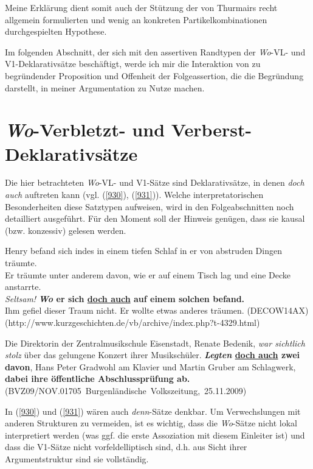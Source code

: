 {Meine Erklärung dient somit auch der Stützung der von Thurmairs recht allgemein formulierten und wenig an konkreten Partikelkombinationen durchgespielten Hypothese.

Im folgenden Abschnitt, der sich mit den assertiven Randtypen der \textit{Wo}-VL- und V1-Deklarativsätze beschäftigt, werde ich mir die Interaktion von zu begründender Proposition und Offenheit der Folgeassertion, die die Begründung darstellt, in meiner Argumentation zu Nutze machen.
\setcounter{equation}{0}
\section{\textit{Wo}-Verbletzt- und Verberst-Deklarativsätze}
\label{sec:Rand}
Die hier betrachteten \textit{Wo}-VL- und V1-Sätze sind Deklarativsätze, in denen \textit{doch auch} auftreten kann (vgl. (\ref{930}), (\ref{931})). Welche interpretatorischen Besonderheiten diese Satztypen aufweisen, wird in den Folgeabschnitten noch detailliert ausgeführt. Für den Moment soll der Hinweis genügen, dass sie kausal (bzw. konzessiv) gelesen werden.

\begin{exe}
	\ex\label{930}
	\scriptsize
	Henry befand sich indes in einem tiefen Schlaf in er von abstruden Dingen träumte.\\
	Er träumte unter anderem davon, wie er auf einem Tisch lag und eine Decke anstarrte.\\
	\emph{Seltsam!} \textbf{\textit{Wo} er sich \underline{doch auch} auf einem solchen befand.}\\
	Ihm gefiel dieser Traum nicht. Er wollte etwas anderes träumen. 				         
	\hfill\hbox{(DECOW14AX)}
	\newline
	\hbox{}\hfill\hbox{(http://www.kurzgeschichten.de/vb/archive/index.php?t-4329.html)}
\end{exe}

\begin{exe}
	\ex\label{931}
	\scriptsize
	Die Direktorin der Zentralmusikschule Eisenstadt, Renate Bedenik, \emph{war sichtlich stolz} über das gelungene Konzert ihrer Musikschüler. 				\textbf{\textit{Legten} \underline{doch auch} zwei davon}, Hans Peter Gradwohl am Klavier und Martin Gruber am Schlagwerk, \textbf{dabei ihre 				öffentliche Abschlussprüfung ab.}				         
	\newline
	\hbox{}\hfill\hbox{(BVZ09/NOV.01705 Burgenländische Volkszeitung, 25.11.2009)}
\end{exe}										      
In (\ref{930}) und (\ref{931}) wären auch \textit{denn}-Sätze denkbar. Um Verwechslungen mit anderen Strukturen zu vermeiden, ist es wichtig, dass die \textit{Wo}-Sätze nicht lokal interpretiert werden (was ggf. die erste Assoziation mit diesem Einleiter ist) und dass die V1-Sätze nicht vorfeldelliptisch sind, d.h. aus Sicht ihrer Argumentstruktur sind sie vollständig.

}
